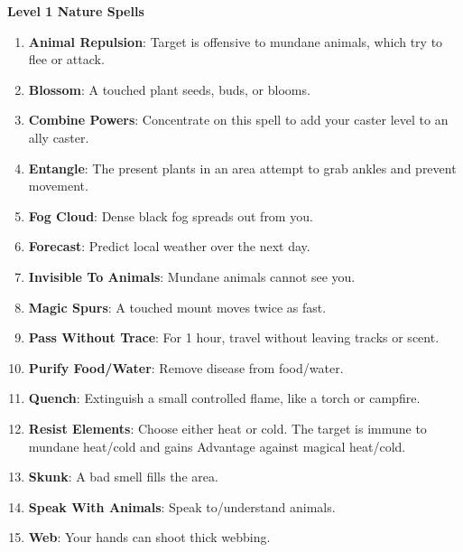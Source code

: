 \documentclass[twoside]{article}
\begin{document}
\textbf{Level 1 Nature Spells}
\begin{enumerate}[nosep]
\item \textbf{Animal Repulsion}: Target is offensive to mundane animals, which try to flee or attack.
\item \textbf{Blossom}: A touched plant seeds, buds, or blooms.
\item \textbf{Combine Powers}: Concentrate on this spell to add your caster level to an ally caster.
\item \textbf{Entangle}: The present plants in an area attempt to grab ankles and prevent movement.
\item \textbf{Fog Cloud}: Dense black fog spreads out from you.
\item \textbf{Forecast}: Predict local weather over the next day.
\item \textbf{Invisible To Animals}: Mundane animals cannot see you.
\item \textbf{Magic Spurs}: A touched mount moves twice as fast.
\item \textbf{Pass Without Trace}: For 1 hour, travel without leaving tracks or scent.
\item \textbf{Purify Food/Water}: Remove disease from food/water.
\item \textbf{Quench}: Extinguish a small controlled flame, like a torch or campfire.
\item \textbf{Resist Elements}: Choose either heat or cold. The target is immune to mundane heat/cold and gains Advantage against magical heat/cold.
\item \textbf{Skunk}: A bad smell fills the area.
\item \textbf{Speak With Animals}: Speak to/understand animals.
\item \textbf{Web}: Your hands can shoot thick webbing.
\end{enumerate}
\end{document}
